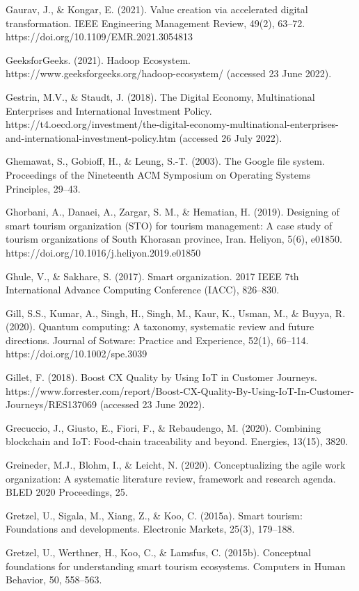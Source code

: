 \documentclass[
  letterpaper,
  DIV=11,
  numbers=noendperiod]{scrreprt}
\begin{document}
Gaurav, J., \& Kongar, E. (2021). Value creation via accelerated digital
transformation. IEEE Engineering Management Review, 49(2), 63--72.
https://doi.org/10.1109/EMR.2021.3054813

GeeksforGeeks. (2021). Hadoop Ecosystem.
https://www.geeksforgeeks.org/hadoop-ecosystem/ (accessed 23 June 2022).

Gestrin, M.V., \& Staudt, J. (2018). The Digital Economy, Multinational
Enterprises and International Investment Policy.
https://t4.oecd.org/investment/the-digital-economy-multinational-enterprises-and-international-investment-policy.htm
(accessed 26 July 2022).

Ghemawat, S., Gobioff, H., \& Leung, S.-T. (2003). The Google file
system. Proceedings of the Nineteenth ACM Symposium on Operating Systems
Principles, 29--43.

Ghorbani, A., Danaei, A., Zargar, S. M., \& Hematian, H. (2019).
Designing of smart tourism organization (STO) for tourism management: A
case study of tourism organizations of South Khorasan province, Iran.
Heliyon, 5(6), e01850. https://doi.org/10.1016/j.heliyon.2019.e01850

Ghule, V., \& Sakhare, S. (2017). Smart organization. 2017 IEEE 7th
International Advance Computing Conference (IACC), 826--830.

Gill, S.S., Kumar, A., Singh, H., Singh, M., Kaur, K., Usman, M., \&
Buyya, R. (2020). Quantum computing: A taxonomy, systematic review and
future directions. Journal of Sotware: Practice and Experience, 52(1),
66--114. https://doi.org/10.1002/spe.3039

Gillet, F. (2018). Boost CX Quality by Using IoT in Customer Journeys.
https://www.forrester.com/report/Boost-CX-Quality-By-Using-IoT-In-Customer-Journeys/RES137069
(accessed 23 June 2022).

Grecuccio, J., Giusto, E., Fiori, F., \& Rebaudengo, M. (2020).
Combining blockchain and IoT: Food-chain traceability and beyond.
Energies, 13(15), 3820.

Greineder, M.J., Blohm, I., \& Leicht, N. (2020). Conceptualizing the
agile work organization: A systematic literature review, framework and
research agenda. BLED 2020 Proceedings, 25.

Gretzel, U., Sigala, M., Xiang, Z., \& Koo, C. (2015a). Smart tourism:
Foundations and developments. Electronic Markets, 25(3), 179--188.

Gretzel, U., Werthner, H., Koo, C., \& Lamsfus, C. (2015b). Conceptual
foundations for understanding smart tourism ecosystems. Computers in
Human Behavior, 50, 558--563.
\end{document}
